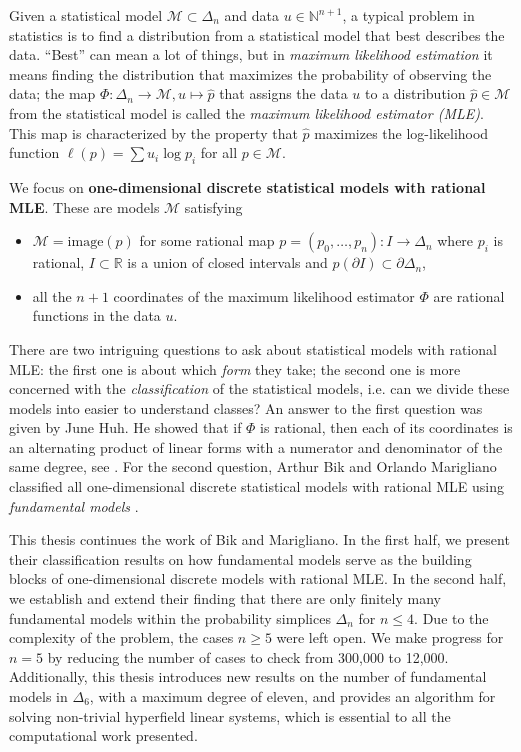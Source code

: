 Given a statistical model \( \mathcal{M} \subset \Delta_n \) and data \( u \in \mathbb{N}^{n+1} \), a typical problem in statistics is to find a distribution from a statistical model that best describes the data. ``Best'' can mean a lot of things, but in \emph{maximum likelihood estimation} it means finding the distribution that maximizes the probability of observing the data; the map \( \Phi: \Delta_n \to \mathcal{M}, u \mapsto \hat p \) that assigns the data \( u \) to a distribution \( \hat p \in \mathcal{M}\) from the statistical model is called the \emph{maximum likelihood estimator (MLE)}. This map is characterized by the property that \( \hat p \) maximizes the log-likelihood function \( \ell(p) = \sum u_i \log p_i \) for all \( p \in \mathcal{M} \). 

We focus on \textbf{{one-dimensional {discrete} {statistical} {models} with rational MLE}}. These are models \( \mathcal{M} \) satisfying 
\begin{itemize}
    \item \( \mathcal{M} = \mathrm{image}(p) \) for some rational map \( p = (p_0, \dots, p_n): I \to \Delta_n \) where \( p_i \) is rational, \( I \subset \mathbb{R} \) is a union of closed intervals and  \( p(\partial I) \subset \partial \Delta_n \),
    \item all the \( n+1 \) coordinates of the maximum likelihood estimator \( \Phi \) are rational functions in the data \( u \).
\end{itemize}
There are two intriguing questions to ask about statistical models with rational MLE: the first one is about which \emph{form} they take; the second one is more concerned with the \emph{classification} of the statistical models, i.e. can we divide these models into easier to understand classes? An answer to the first question was given by June Huh. He showed that if \( \Phi \) is rational, then each of its coordinates is an alternating product of linear forms with a numerator and denominator of the same degree, see \cite{huh2013varieties, huh2013maximum, duarte2021discrete}. For the second question, Arthur Bik and Orlando Marigliano classified all one-dimensional discrete statistical models with rational MLE using \emph{fundamental models} \cite{bik2022classifying}.

This thesis continues the work of Bik and Marigliano. In the first half, we present their classification results on how fundamental models serve as the building blocks of one-dimensional discrete models with rational MLE. In the second half, we establish and extend their finding that there are only finitely many fundamental models within the probability simplices \( \Delta_n  \) for \( n \leq 4 \). Due to the complexity of the problem, the cases \( n \geq 5 \) were left open. We make progress for \( n = 5 \) by reducing the number of cases to check from 300,000 to 12,000. Additionally, this thesis introduces new results on the number of fundamental models in \( \Delta_6 \), with a maximum degree of eleven, and provides an algorithm for solving non-trivial hyperfield linear systems, which is essential to all the computational work presented.

